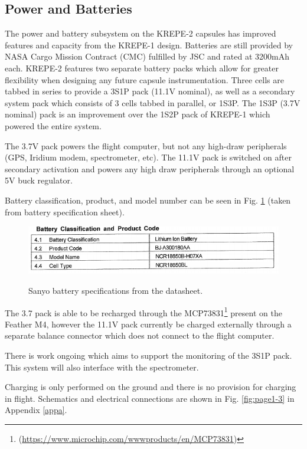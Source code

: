 \documentclass{article}
\begin{document}
\subsection{Power and Batteries}

The power and battery subsystem on the KREPE-2 capsules has improved features and capacity from the KREPE-1 design. Batteries are still provided by NASA Cargo Mission Contract (CMC) fulfilled by JSC and rated at 3200mAh each. KREPE-2 features two separate battery packs which allow for greater flexibility when designing any future capsule instrumentation. Three cells are tabbed in series to provide a 3S1P pack (11.1V nominal), as well as a secondary system pack which consists of 3 cells tabbed in parallel, or 1S3P. The 1S3P (3.7V nominal) pack is an improvement over the 1S2P pack of KREPE-1 which powered the entire system.

The 3.7V pack powers the flight computer, but not any high-draw peripherals (GPS, Iridium modem, spectrometer, etc). The 11.1V pack is switched on after secondary activation and powers any high draw peripherals through an optional 5V buck regulator. 

Battery classification, product, and model number can be seen in Fig. \ref{fig:bat-spec} (taken from battery specification sheet).

\begin{figure}[h!]
	\centering
	\includegraphics[width=12cm]{images/battery-spec.png}
	\label{fig:bat-spec}
	\caption{Sanyo battery specifications from the datasheet.}
\end{figure}

The 3.7 pack is able to be recharged through the MCP73831\footnote{ (\url{https://www.microchip.com/wwwproducts/en/MCP73831})} present on the Feather M4, however the 11.1V pack currently be charged externally through a separate balance connector which does not connect to the flight computer.  

There is work ongoing which aims to support the monitoring of the 3S1P pack. This system will also interface with the spectrometer. 

Charging is only performed on the ground and there is no provision for charging in flight. Schematics and electrical connections are shown in Fig. \ref{fig:page1-3} in Appendix \ref{appa}.
\end{document}
